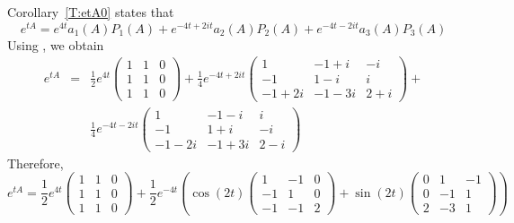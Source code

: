 Corollary~\ref{T:etA0} states that
\[
e^{tA} = e^{4t}a_1(A)P_1(A)+e^{-4t+2it}a_2(A)P_2(A)
	+e^{-4t-2it}a_3(A)P_3(A)
\]
Using \Matlabp, we obtain
\begin{eqnarray*}
e^{tA} & = & \frac{1}{2}e^{4t} 
\left(\begin{array}{rrr}
     1    &      1    &       0  \\    
     1    &      1    &       0  \\    
     1    &      1    &       0      
\end{array}\right)  + 
\frac{1}{4}e^{-4t+2it}
\left(\begin{array}{ccc}
     1     &    -1      +    i     &      -i   \\ 
    -1     &     1      -    i     &       i    \\
 -1  + 2i  &    -1      -   3i    &     2 + i   
\end{array}\right) + \\
& & \frac{1}{4}e^{-4t-2it}
\left(\begin{array}{ccc}
     1     &    -1      -    i     &       i   \\ 
    -1     &     1      +    i     &      -i    \\
 -1  - 2i  &    -1      +    3i    &     2 - i   
\end{array}\right)
\end{eqnarray*}
Therefore,
\[
e^{tA} = \frac{1}{2}e^{4t}
\left(\begin{array}{rrr}
     1    &      1    &       0  \\
     1    &      1    &       0  \\
     1    &      1    &       0
\end{array}\right)  
+ \frac{1}{2}e^{-4t}\left(\cos(2t)\left(\begin{array}{rrr}
1 & -1 & 0\\ -1 & 1 & 0\\ -1 & -1 & 2 \end{array}\right)+\sin(2t)
\left(\begin{array}{rrr}
0 & 1 & -1\\ 0 & -1 & 1\\ 2 & -3 & 1 \end{array}\right)\right)
\]

